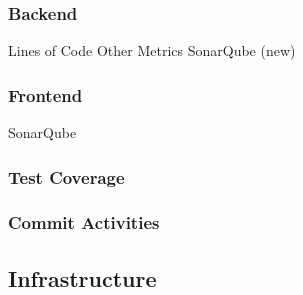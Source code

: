 \subsubsection{Backend}
Lines of Code
Other Metrics
SonarQube (new)

\subsubsection{Frontend}
SonarQube

\subsubsection{Test Coverage}

\subsubsection{Commit Activities}


\subsection{Infrastructure}
